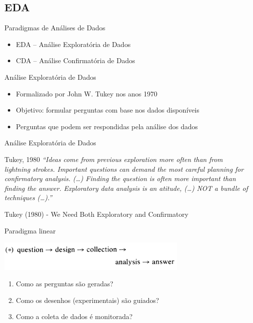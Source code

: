 \documentclass{beamer}
\begin{document}
\subsection{EDA}

\begin{frame}{Paradigmas de Análises de Dados}
  \begin{itemize}
  \item EDA -- Análise Exploratória de Dados
  \item CDA -- Análise Confirmatória de Dados
  \end{itemize}
\end{frame}

\begin{frame}{Análise Exploratória de Dados}
  \begin{itemize}
  \item Formalizado por John W. Tukey nos anos 1970
  \item Objetivo: formular perguntas com base nos dados disponíveis
  \item Perguntas que podem ser respondidas pela análise dos dados
  \end{itemize}
\end{frame}

\begin{frame}{Análise Exploratória de Dados}
  \begin{block}{Tukey, 1980}
    {\em ``Ideas come from previous exploration more often than from
      lightning strokes. Important questions can demand the most
      careful planning for confirmatory analysis. (\ldots) Finding the
      question is often more important than finding the
      answer. Exploratory data analysis is an atitude, (\ldots) NOT a
      bundle of techniques (\ldots).''}
  \end{block}

Tukey (1980) - We Need Both Exploratory and Confirmatory
\end{frame}

\begin{frame}{Paradigma linear}
  \begin{center}
    \includegraphics[width=0.7\textwidth]{tukey1}
  \end{center}
  \begin{enumerate}
  \item Como as perguntas são geradas?
  \item Como os desenhos (experimentais) são guiados?
  \item Como a coleta de dados é monitorada?
  \end{enumerate}
\end{frame}
\end{document}
